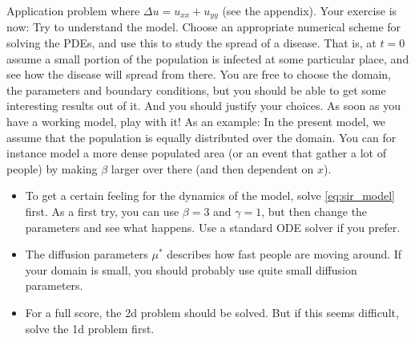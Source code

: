 \begin{railingbox}{Application problem}
  where \(\Delta u = u_{xx} + u_{yy}\) (see the appendix). Your exercise is now: Try to understand the model. 
  Choose an appropriate numerical scheme for solving the PDEs, and use this to study the spread of a disease. 
  That is, at \(t = 0\) assume a small portion of the population is infected at some particular place, and see how the disease will spread from there. 
  You are free to choose the domain, the parameters and boundary conditions, but you should be able to get some interesting results out of it. 
  And you should justify your choices. As soon as you have a working model, play with it! 
  As an example: In the present model, we assume that the population is equally distributed over the domain. 
  You can for instance model a more dense populated area (or an event that gather a lot of people) by making \(\beta\) larger over there (and then dependent on \(x\)).
  \begin{itemize}
    \item To get a certain feeling for the dynamics of the model, solve \eqref{eq:sir_model} first. As a first try, you can use \(\beta = 3\) and \(\gamma = 1\), but then change the parameters and see what happens. Use a standard ODE solver if you prefer.
    \item The diffusion parameters \(\mu^*\) describes how fast people are moving around. If your domain is small, you should probably use quite small diffusion parameters.
    \item For a full score, the 2d problem should be solved. But if this seems difficult, solve the 1d problem first.
  \end{itemize}
\end{railingbox}
